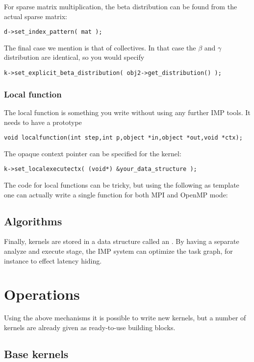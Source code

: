 \documentclass[11pt,fleqn,preprint]{impreport}
\begin{document}
For sparse matrix multiplication, the beta distribution can be
found from the actual sparse matrix:
\begin{verbatim}
d->set_index_pattern( mat );
\end{verbatim}

The final case we mention is that of collectives. In that case
the $\beta$ and $\gamma$ distribution are identical, so you would
specify
\begin{verbatim}
k->set_explicit_beta_distribution( obj2->get_distribution() );
\end{verbatim}

\subsubsection{Local function}

The local function is something you write without using any further
IMP tools. It needs to have a prototype
\begin{verbatim}
void localfunction(int step,int p,object *in,object *out,void *ctx);
\end{verbatim}
The opaque context pointer can be specified for the kernel:
\begin{verbatim}
k->set_localexecutectx( (void*) &your_data_structure );
\end{verbatim}

The code for local functions can be tricky, but using the following as
template one can actually write a single function for both MPI and
OpenMP mode:

\subsection{Algorithms}

Finally, kernels are stored in a data structure called an
.
%
%
By having a separate analyze and execute stage, the IMP system can
optimize the task graph, for instance to effect latency hiding.

\section{Operations}

Using the above mechanisms it is possible to write new kernels, but a
number of kernels are already given as ready-to-use building blocks.

\subsection{Base kernels}
\end{document}
